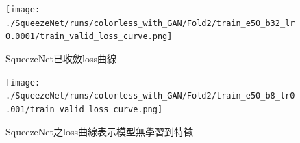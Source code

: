 \begin{abstract}
    \noindent\textbf{E. SqueezeNet}\\
    在SqueezeNet的模型訓練當中，觀察accurracy、loss曲線：
    \begin{enumerate}
        \item SqueezeNet在不論是有無使用GAN進行擴充的資料集下，loss曲線幾乎都有收斂\ref{fig:SqueezeNet_convergence_loss_curve}，除了在batch size為8與learning rate為1e-3，以本次實驗來說batch size極小learning rate極大的情況下，loss曲線完全沒有收斂\ref{fig:SqueezeNet_unconvergence_loss_curve}，甚至是模型完全沒有學習到特徵。
        \item 而在learning rate為1e-3的情況下，多數的loss曲線會在epoch為10左右出現較大的起伏\ref{fig:SqueezeNet_unconvergence_loss_curve_1e-3}，進而影響到後面的模型收斂與最後的準確率。
        \item 準確度上因為多數情況下loss曲線都有收斂，所以準確度普遍落在0.96左右\ref{fig:SqueezeNet_accuracy_curve_0.96}，在learning rate為1e-3，並且最後有收斂的情況下，準確率在0.69左右\ref{fig:SqueezeNet_accuracy_curve_0.69}。
        \item 針對有使用GAN的資料集，在loss曲線有收斂完成的情況下，準確率與無使用GAN的資料集無明顯差異。
    \end{enumerate}
    在SqueezeNet的模型訓練當中，觀察confusion matrix與其指標：
    \begin{enumerate}
        \item 對於同一個class，在loss曲線有收斂完成的情況下，precision與recall都達到0.96左右，而未完成收斂的情況則是precision與recall數據持平，表示模型並沒有完整學習到特徵。
        \item 以confusion matrix綜觀全部的classes，最差的表現通常落在open、good，又以open的情況又較差\ref{fig:SqueezeNet_confuson_matrix}。
    \end{enumerate}
\end{abstract}
\begin{figure}[H]
    \centering
    \texttt{[image: ./SqueezeNet/runs/colorless\_with\_GAN/Fold2/train\_e50\_b32\_lr0.0001/train\_valid\_loss\_curve.png]}
    \caption{SqueezeNet已收斂loss曲線}
    \label{fig:SqueezeNet_convergence_loss_curve}
\end{figure}
\begin{figure}[H]
    \centering
    \texttt{[image: ./SqueezeNet/runs/colorless\_with\_GAN/Fold2/train\_e50\_b8\_lr0.001/train\_valid\_loss\_curve.png]}
    \caption{SqueezeNet之loss曲線表示模型無學習到特徵}
    \label{fig:SqueezeNet_unconvergence_loss_curve}
\end{figure}
